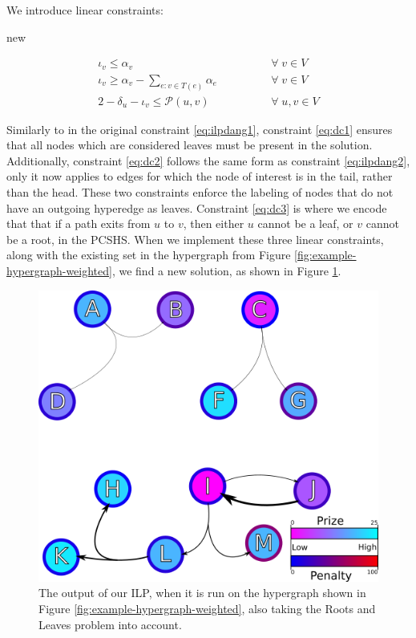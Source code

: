 \documentclass[12pt,twoside]{reedthesis}
\theoremstyle{definition}
\begin{document}
{We introduce linear constraints:

}{new}

\begin{align}
 \iota_v \leq \alpha_v \qquad\qquad &\forall\; v \in V\label{eq:dc1}\\
 \iota_v \geq \alpha_{v} - \sum_{e:v \in T(e)} \alpha_e \qquad\qquad &\forall\; v \in V\label{eq:dc2}\\
 2 - \delta_u - \iota_v \leq \mathcal{P}(u,v) \qquad\qquad &\forall\; u,v \in V\label{eq:dc3}%
\end{align}%

Similarly to in the original constraint \eqref{eq:ilpdang1}, constraint \eqref{eq:dc1} ensures that all nodes which are considered leaves must be present in the solution. Additionally, constraint \eqref{eq:dc2} follows the same form as constraint \eqref{eq:ilpdang2}, only it now applies to edges for which the node of interest is in the tail, rather than the head. These two constraints enforce the labeling of nodes that do not have an outgoing hyperedge as leaves. Constraint \eqref{eq:dc3} is where we encode that that if a path exits from $u$ to $v$, then either $u$ cannot be a leaf, or $v$ cannot be a root, in the PCSHS. When we implement these three linear constraints, along with the existing set in the hypergraph from Figure \ref{fig:example-hypergraph-weighted}, we find a new solution, as shown in Figure \ref{fig:example-hypergraph-weighted_DC}.

\begin{figure}[hp]
  \begin{center}
    \includegraphics{example-hypergraph-weighted_DC}
  \caption[Output from ILP after Roots and Leaves.]{The output of our ILP, when it is run on the hypergraph shown in Figure \ref{fig:example-hypergraph-weighted}, also taking the Roots and Leaves problem into account.}
  \label{fig:example-hypergraph-weighted_DC}
  \end{center}
\end{figure}
\end{document}

